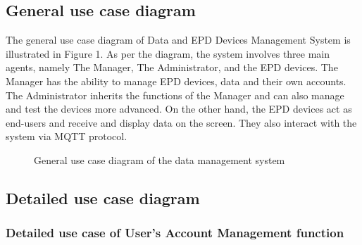 \documentclass[../Main.tex]{subfiles}
\begin{document}
\subsection{General use case diagram}
\label{subsection:2.2.1}
The general use case diagram of Data and EPD Devices Management System is illustrated in Figure 1. As per the diagram, the system involves three main agents, namely The Manager, The Administrator, and the EPD devices. The Manager has the ability to manage EPD devices, data and their own accounts. The Administrator inherits the functions of the Manager and can also manage and test the devices more advanced. On the other hand, the EPD devices act as end-users and receive and display data on the screen. They also interact with the system via MQTT protocol.
\begin{figure}[htbp]
  \centering
{}
\caption{General use case diagram of the data management system}
\label{fig:usecasediagram}
\end{figure}

\subsection{Detailed use case diagram}
\label{subsection:2.2.2}

\subsubsection{Detailed use case of User's Account Management function}
\end{document}
